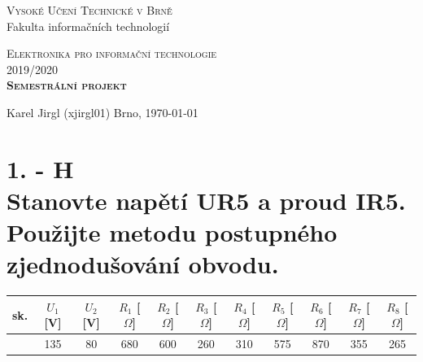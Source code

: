 \documentclass[12pt,a4paper]{article}         %
\begin{document}
    \begin{titlepage}
        \begin{center}
        	\textsc{\LARGE Vysoké Učení Technické v Brně}
        	    \\[0.5cm]
        	    {\LARGE Fakulta informačních technologií}
        
        	\vspace{6cm}
        
        	\textsc{\LARGE Elektronika pro informační technologie}
        	    \\[0.6cm]
                \textsc{\LARGE 2019/2020}
                \\[4cm]
                \textbf{\textsc{\LARGE Semestrální projekt}}
        \end{center}
        
        \vfill
        
        \begin{flushleft}
        	Karel Jirgl (xjirgl01)
        	\hfill
        	Brno, \today
        \end{flushleft}
    \end{titlepage}

    \section*{1. - H \\
    Stanovte napětí UR5 a proud IR5. Použijte metodu postupného zjednodušování obvodu.}

 \begin{tabular}{|c|c|c|c|c|c|c|c|c|c|c|} \hline
sk. & $U_1$ [V] & $U_2$ [V]  & $R_1$ [$\Omega$] & $R_2$ [$\Omega$] & $R_3$ [$\Omega$] & $R_4$ [$\Omega$] & $R_5$ [$\Omega$] & $R_6$ [$\Omega$] & $R_7$ [$\Omega$] & $R_8$ [$\Omega$] \\ \hline

    {H & 135 & 80 & 680 & 600 & 260 & 310 & 575 & 870 & 355 & 265}{}
    
    \\ \hline \end{tabular} \\
\end{document}
